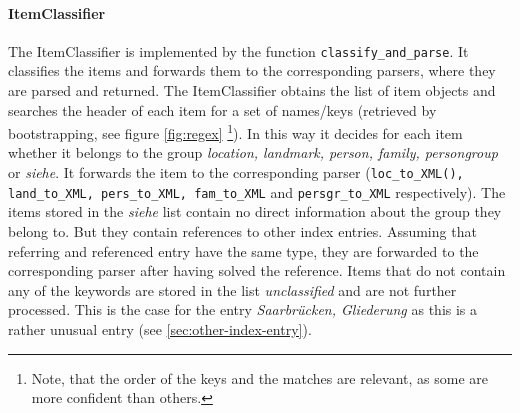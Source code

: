 \paragraph{ItemClassifier}
The ItemClassifier is implemented by the function \texttt{classify\_and\_parse}. It classifies the items and forwards them to the corresponding parsers, where they are parsed and returned. The ItemClassifier obtains the list of item objects and searches the header of each item for a set of names/keys (retrieved by bootstrapping, see figure \ref{fig:regex} \footnote{Note, that the order of the keys and the matches are relevant, as some are more confident than others.}). In this way it decides for each item whether it belongs to the group \textit{location, landmark, person, family, persongroup} or \textit{siehe}. It forwards the item to the corresponding parser (\texttt{loc\_to\_XML(), land\_to\_XML, pers\_to\_XML, fam\_to\_XML} and \texttt{persgr\_to\_XML} respectively). The items stored in the \textit{siehe} list contain no direct information about the group they belong to. But they contain references to other index entries. Assuming that referring and referenced entry have the same type, they are forwarded to the corresponding parser after having solved the reference. Items that do not contain any of the keywords are stored in the list \textit{unclassified} and are not further processed. This is the case for the entry \textit{Saarbrücken, Gliederung} as this is a rather unusual entry (see \ref{sec:other-index-entry}).

